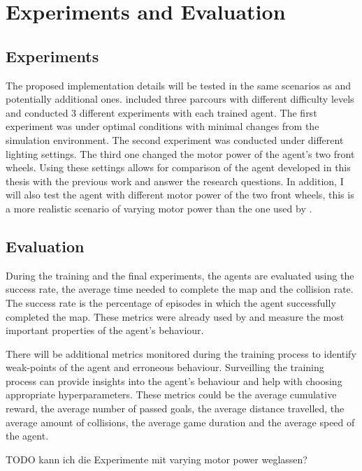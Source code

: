 \chapter{Experiments and Evaluation}
\label{cha:Experiments and Evaluation}

\section{Experiments}

The proposed implementation details will be tested in the same scenarios as \autocite{maximilian} and potentially additional ones. \autocite{maximilian} included three parcours with different difficulty levels and conducted 3 different experiments with each trained agent. The first experiment was under optimal conditions with minimal changes from the simulation environment. The second experiment was conducted under different lighting settings. The third one changed the motor power of the agent's two front wheels. Using these settings allows for comparison of the agent developed in this thesis with the previous work and answer the research questions.
In addition, I will also test the agent with different motor power of the two front wheels, this is a more realistic scenario of varying motor power than the one used by \autocite{maximilian}.

\section{Evaluation}

During the training and the final experiments, the agents are evaluated using the success rate, the average time needed to complete the map and the collision rate. The success rate is the percentage of episodes in which the agent successfully completed the map. These metrics were already used by \autocite{maximilian} and measure the most important properties of the agent's behaviour.

There will be additional metrics monitored during the training process to identify weak-points of the agent and erroneous behaviour. Surveilling the training process can provide insights into the agent's behaviour and help with choosing appropriate hyperparameters.
These metrics could be the average cumulative reward, the average number of passed goals, the average distance travelled, the average amount of collisions, the average game duration and the average speed of the agent.



TODO kann ich die Experimente mit varying motor power weglassen?